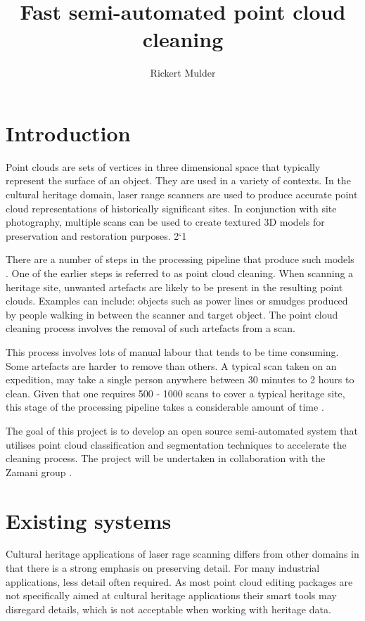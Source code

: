 \documentclass[10pt,twocolumn]{article}
\title{Fast semi-automated point cloud cleaning}
\author{Rickert Mulder}
\begin{document}
\maketitle

\section{Introduction}
Point clouds are sets of vertices in three dimensional space that typically represent the surface of an object. They are used in a variety of contexts. In the cultural heritage domain, laser range scanners are used to produce accurate point cloud representations of historically significant sites. In conjunction with site photography, multiple scans can be used to create textured 3D models for preservation and restoration purposes.
2`1

There are a number of steps in the processing pipeline that produce such models \cite{Ruther2011}. One of the earlier steps is referred to as point cloud cleaning. When scanning a heritage site, unwanted artefacts are likely to be present in the resulting point clouds. Examples can include: objects such as power lines or smudges produced by people walking in between the scanner and target object. The point cloud cleaning process involves the removal of such artefacts from a scan.

This process involves lots of manual labour that tends to be time consuming. Some artefacts are harder to remove than others. A typical scan taken on an expedition, may take a single person anywhere between 30 minutes to 2 hours to clean. Given that one requires 500 - 1000 scans to cover a typical heritage site, this stage of the processing pipeline takes a considerable amount of time \cite{Ruther2011}.

The goal of this project is to develop an open source semi-automated system that utilises point cloud classification and segmentation techniques to accelerate the cleaning process. The project will be undertaken in collaboration with the Zamani group \cite{Ruther2011}.

\section{Existing systems}
Cultural heritage applications of laser rage scanning differs from other domains in that there is a strong emphasis on preserving detail. For many industrial applications, less detail often required. As most point cloud editing packages are not specifically aimed at cultural heritage applications their smart tools may disregard details, which is not acceptable when working with heritage data.
\end{document}
